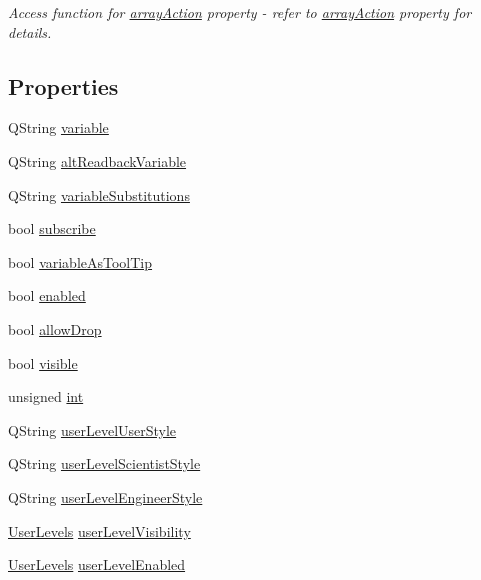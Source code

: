 \begin{DoxyCompactItemize}
\begin{DoxyCompactList}\small\item\em Access function for \hyperlink{classQEPushButton_a4f7d3bd9238cfbb811ae4aa83bc499eb}{arrayAction} property -\/ refer to \hyperlink{classQEPushButton_a4f7d3bd9238cfbb811ae4aa83bc499eb}{arrayAction} property for details. \end{DoxyCompactList}\end{DoxyCompactItemize}
\subsection*{Properties}
\begin{DoxyCompactItemize}
\item 
QString \hyperlink{classQEPushButton_adb5a937357068be51507e62e18921561}{variable}
\item 
QString \hyperlink{classQEPushButton_ab6eb074afea7056b844a4a712cdf594c}{altReadbackVariable}
\item 
QString \hyperlink{classQEPushButton_a9112669af4b7922193ef03e8d9636f9c}{variableSubstitutions}
\item 
bool \hyperlink{classQEPushButton_ae3b3fce6a82cb4982174855b7c5af2f3}{subscribe}
\item 
bool \hyperlink{classQEPushButton_a4c9ac62a902c4684eac2c18891f776d4}{variableAsToolTip}
\item 
bool \hyperlink{classQEPushButton_a223d8878ab3e235c7da509731d489737}{enabled}
\item 
bool \hyperlink{classQEPushButton_a634514662515a307ecf680584cdf2cda}{allowDrop}
\item 
bool \hyperlink{classQEPushButton_a090ec7fbc7112a38ceb7c91e651f9770}{visible}
\item 
unsigned \hyperlink{classQEPushButton_af2101a8ce89f2fa34261cc8b6d2d4715}{int}
\item 
QString \hyperlink{classQEPushButton_a70367130f27010d02c5b99ba5efc1a71}{userLevelUserStyle}
\item 
QString \hyperlink{classQEPushButton_a53f440b11919a757045b0fc46bcbfa97}{userLevelScientistStyle}
\item 
QString \hyperlink{classQEPushButton_a2397eaaa00d562429bd84bf5e04ade53}{userLevelEngineerStyle}
\item 
\hyperlink{classQEPushButton_a1afc62a8bcda84a0c2ec4c5032547620}{UserLevels} \hyperlink{classQEPushButton_ad95a2bf16f07fbb22fb66bb8e61c02d1}{userLevelVisibility}
\item 
\hyperlink{classQEPushButton_a1afc62a8bcda84a0c2ec4c5032547620}{UserLevels} \hyperlink{classQEPushButton_a6a2efa62cba908ac5647df6c6fd0a381}{userLevelEnabled}

\end{DoxyCompactItemize}

